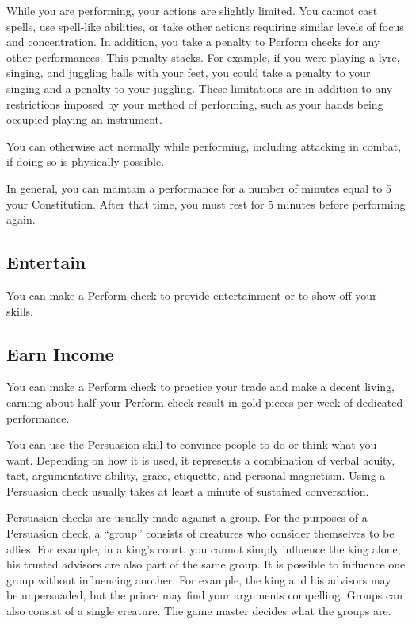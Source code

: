         While you are performing, your actions are slightly limited.
        You cannot cast spells, use spell-like abilities, or take other actions requiring similar levels of focus and concentration.
        In addition, you take a  penalty to Perform checks for any other performances.
        This penalty stacks.
        For example, if you were playing a lyre, singing, and juggling balls with your feet, you could take a  penalty to your singing and a  penalty to your juggling.
        These limitations are in addition to any restrictions imposed by your method of performing, such as your hands being occupied playing an instrument.

        You can otherwise act normally while performing, including attacking in combat, if doing so is physically possible.

        In general, you can maintain a performance for a number of minutes equal to 5 \add your Constitution.
        After that time, you must rest for 5 minutes before performing again.

    \subsection{Entertain}
        You can make a Perform check to provide entertainment or to show off your skills.

    \subsection{Earn Income}
        You can make a Perform check to practice your trade and make a decent living, earning about half your Perform check result in gold pieces per week of dedicated performance.

        You can use the Persuasion skill to convince people to do or think what you want. Depending on how it is used, it represents a combination of verbal acuity, tact, argumentative ability, grace, etiquette, and personal magnetism. Using a Persuasion check usually takes at least a minute of sustained conversation.

        Persuasion checks are usually made against a group. For the purposes of a Persuasion check, a ``group'' consists of creatures who consider themselves to be allies. For example, in a king's court, you cannot simply influence the king alone; his trusted advisors are also part of the same group. It is possible to influence one group without influencing another. For example, the king and his advisors may be unpersuaded, but the prince may find your arguments compelling. Groups can also consist of a single creature. The game master decides what the groups are.

